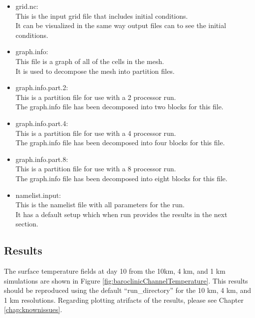 \begin{itemize}
	\item grid.nc: \\
		This is the input grid file that includes initial conditions.  \\
		It can be visualized in the same way output files can to see the initial conditions.
	\item graph.info: \\
		This file is a graph of all of the cells in the mesh. \\
		It is used to decompose the mesh into partition files.
	\item graph.info.part.2: \\
		This is a partition file for use with a 2 processor run. \\
		The graph.info file has been decomposed into two blocks for this file.
	\item graph.info.part.4: \\
		This is a partition file for use with a 4 processor run. \\
		The graph.info file has been decomposed into four blocks for this file.
	\item graph.info.part.8: \\
		This is a partition file for use with a 8 processor run. \\
		The graph.info file has been decomposed into eight blocks for this file.
	\item namelist.input: \\
		This is the namelist file with all parameters for the run. \\
		It has a default setup which when run provides the results in the next section.
\end{itemize}

\subsection{Results}
\label{subsecc:baroclinic_channel_results}
The surface temperature fields at day 10 from the 10km, 4 km, and 1 km simulations are shown in Figure \ref{fig:baroclinicChannelTemperature}.
This results should be reproduced using the default ``run\_directory'' for the 10 km, 4 km, and 1 km resolutions. Regarding plotting atrifacts of the results, please see Chapter \ref{chap:knownissues}.

